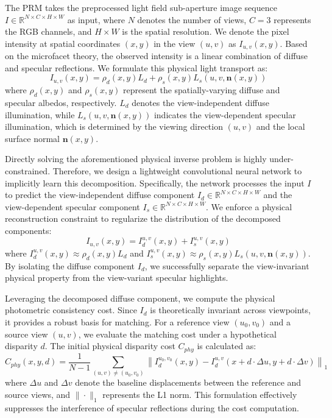 The PRM takes the preprocessed light field sub-aperture image sequence $I \in \mathbb{R}^{N \times C \times H \times W}$ as input, where $N$ denotes the number of views, $C=3$ represents the RGB channels, and $H \times W$ is the spatial resolution. We denote the pixel intensity at spatial coordinates $(x,y)$ in the view $(u,v)$ as $I_{u,v}(x,y)$. Based on the microfacet theory, the observed intensity is a linear combination of diffuse and specular reflections. We formulate this physical light transport as:
\begin{equation}
\label{eq:eq28}
I_{u,v}(x,y) = \rho_d(x,y) L_d + \rho_s(x,y) L_s(u,v, \mathbf{n}(x,y))
\end{equation}
where $\rho_d(x,y)$ and $\rho_s(x,y)$ represent the spatially-varying diffuse and specular albedos, respectively. $L_d$ denotes the view-independent diffuse illumination, while $L_s(u,v, \mathbf{n}(x,y))$ indicates the view-dependent specular illumination, which is determined by the viewing direction $(u,v)$ and the local surface normal $\mathbf{n}(x,y)$.

Directly solving the aforementioned physical inverse problem is highly under-constrained. Therefore, we design a lightweight convolutional neural network to implicitly learn this decomposition. Specifically, the network processes the input $I$ to predict the view-independent diffuse component $I_d \in \mathbb{R}^{N \times C \times H \times W}$ and the view-dependent specular component $I_s \in \mathbb{R}^{N \times C \times H \times W}$. We enforce a physical reconstruction constraint to regularize the distribution of the decomposed components:
\begin{equation}
\label{eq:eq29}
I_{u,v}(x,y) = I_d^{u,v}(x,y) + I_s^{u,v}(x,y)
\end{equation}
where $I_d^{u,v}(x,y) \approx \rho_d(x,y) L_d$ and $I_s^{u,v}(x,y) \approx \rho_s(x,y) L_s(u,v, \mathbf{n}(x,y))$. By isolating the diffuse component $I_d$, we successfully separate the view-invariant physical property from the view-variant specular highlights.

Leveraging the decomposed diffuse component, we compute the physical photometric consistency cost. Since $I_d$ is theoretically invariant across viewpoints, it provides a robust basis for matching. For a reference view $(u_0, v_0)$ and a source view $(u,v)$, we evaluate the matching cost under a hypothetical disparity $d$. The initial physical disparity cost $C_{phy}$ is calculated as:
\begin{equation}
\label{eq:eq30}
C_{phy}(x,y,d) = \frac{1}{N-1} \sum_{(u,v) \neq (u_0,v_0)} \left\| I_d^{u_0,v_0}(x,y) - I_d^{u,v}(x + d \cdot \Delta u, y + d \cdot \Delta v) \right\|_1
\end{equation}
where $\Delta u$ and $\Delta v$ denote the baseline displacements between the reference and source views, and $\|\cdot\|_1$ represents the L1 norm. This formulation effectively suppresses the interference of specular reflections during the cost computation.

